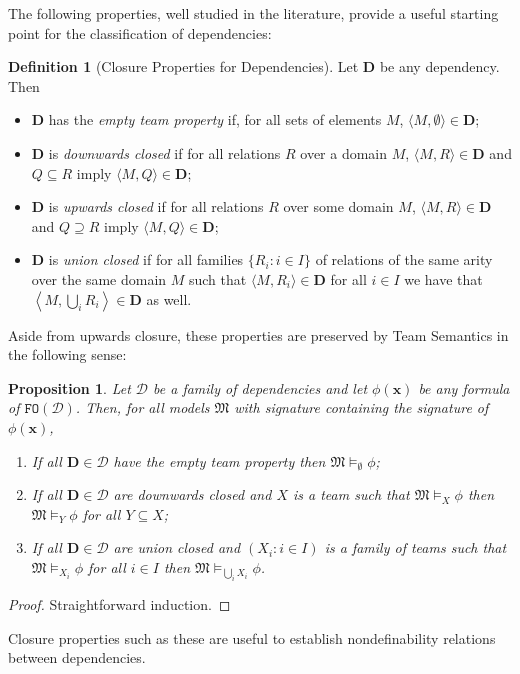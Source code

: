 \documentclass{article}
\newtheorem{Proposition}[Theorem]{Proposition}
\theoremstyle{definition}
\newtheorem{Definition}[Theorem]{Definition}
\newcommand{\tuple}{\mathbf}
\newcommand{\FO}{\texttt{FO}}
\newcommand{\M}{\mathfrak M}
\newcommand{\D}{\mathbf D}
\newcommand{\DD}{\mathcal D}
\begin{document}
The following properties, well studied in the literature, provide a useful starting point for the classification of dependencies: 
\begin{Definition}[Closure Properties for Dependencies]
Let $\D$ be any dependency. Then 
\begin{itemize}
\item $\D$ has the \emph{empty team property} if, for all sets of elements $M$, $\langle M, \emptyset\rangle \in \D$; 
\item $\D$ is \emph{downwards closed} if for all relations $R$ over a domain $M$, $\langle M, R\rangle \in \D$ and $Q \subseteq R$ imply $\langle M, Q\rangle \in \D$; 
\item $\D$ is \emph{upwards closed} if for all relations $R$ over some domain $M$, $\langle M, R\rangle \in \D$ and $Q \supseteq R$ imply $\langle M, Q\rangle \in \D$; 
\item $\D$ is \emph{union closed} if for all families $\{R_i : i \in I\}$ of relations of the same arity over the same domain $M$ such that $\langle M, R_i\rangle \in \D$ for all $i \in I$ we have that $\left \langle M, \bigcup_i R_i\right \rangle \in \D$ as well.

\end{itemize}
\end{Definition}
Aside from upwards closure, these properties are preserved by Team Semantics in the following sense: 
\begin{Proposition}
Let $\DD$ be a family of dependencies and let $\phi(\tuple x)$ be any formula of $\FO(\DD)$. Then, for all models $\M$ with signature containing the signature of $\phi(\tuple x)$, 
\begin{enumerate}
\item If all $\D \in \DD$ have the empty team property then $\M \models_\emptyset \phi$; 
\item If all $\D \in \DD$ are downwards closed and $X$ is a team such that $\M \models_X \phi$ then $\M \models_Y \phi$ for all $Y \subseteq X$;
\item If all $\D \in \DD$ are union closed and $(X_i : i \in I)$ is a family of teams such that $\M \models_{X_i} \phi$ for all $i \in I$ then $\M \models_{\bigcup_i X_i} \phi$.
\end{enumerate}
\label{propo:clos_cons}
\end{Proposition}
\begin{proof}
Straightforward induction. 
\end{proof}
Closure properties such as these are useful to establish nondefinability relations between dependencies. 
\end{document}

